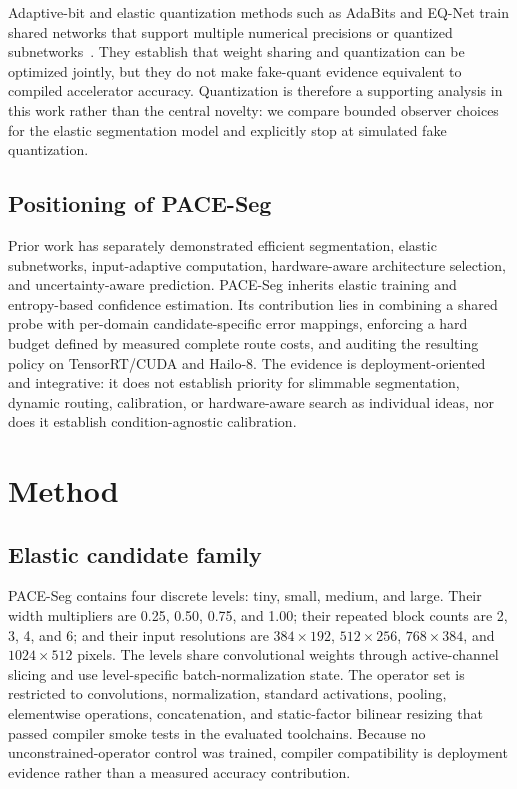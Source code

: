 \documentclass[a4paper,review,12pt]{elsarticle}
\newcommand{\method}{PACE-Seg}
\begin{document}
Adaptive-bit and elastic quantization methods such as AdaBits and EQ-Net train shared networks that support multiple numerical precisions or quantized subnetworks~\cite{jin2020adabits,xu2023eqnet}. They establish that weight sharing and quantization can be optimized jointly, but they do not make fake-quant evidence equivalent to compiled accelerator accuracy. Quantization is therefore a supporting analysis in this work rather than the central novelty: we compare bounded observer choices for the elastic segmentation model and explicitly stop at simulated fake quantization.

\subsection{Positioning of PACE-Seg}

Prior work has separately demonstrated efficient segmentation, elastic subnetworks, input-adaptive computation, hardware-aware architecture selection, and uncertainty-aware prediction. \method{} inherits elastic training and entropy-based confidence estimation. Its contribution lies in combining a shared probe with per-domain candidate-specific error mappings, enforcing a hard budget defined by measured complete route costs, and auditing the resulting policy on TensorRT/CUDA and Hailo-8. The evidence is deployment-oriented and integrative: it does not establish priority for slimmable segmentation, dynamic routing, calibration, or hardware-aware search as individual ideas, nor does it establish condition-agnostic calibration.

\section{Method}
\label{sec:method}

\subsection{Elastic candidate family}
\label{sec:elastic}

\method{} contains four discrete levels: tiny, small, medium, and large. Their width multipliers are 0.25, 0.50, 0.75, and 1.00; their repeated block counts are 2, 3, 4, and 6; and their input resolutions are $384\times192$, $512\times256$, $768\times384$, and $1024\times512$ pixels. The levels share convolutional weights through active-channel slicing and use level-specific batch-normalization state. The operator set is restricted to convolutions, normalization, standard activations, pooling, elementwise operations, concatenation, and static-factor bilinear resizing that passed compiler smoke tests in the evaluated toolchains. Because no unconstrained-operator control was trained, compiler compatibility is deployment evidence rather than a measured accuracy contribution.
\end{document}
